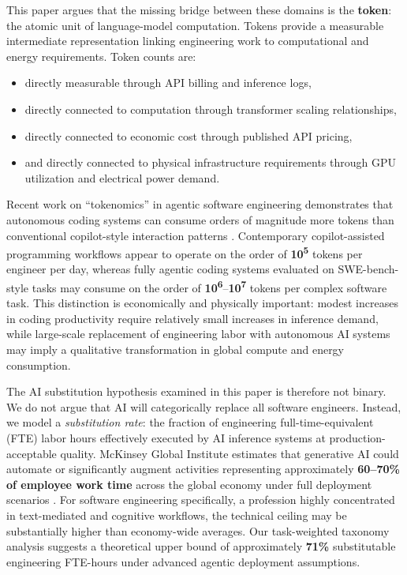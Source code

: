 \documentclass{article}
\begin{document}
This paper argues that the missing bridge between these domains is the \textbf{token}: the atomic unit of language-model computation. Tokens provide a measurable intermediate representation linking engineering work to computational and energy requirements. Token counts are:
\begin{itemize}
  \item directly measurable through API billing and inference logs,
  \item directly connected to computation through transformer scaling relationships,
  \item directly connected to economic cost through published API pricing,
  \item and directly connected to physical infrastructure requirements through GPU utilization and electrical power demand.
\end{itemize}

Recent work on ``tokenomics'' in agentic software engineering demonstrates that autonomous coding systems can consume orders of magnitude more tokens than conventional copilot-style interaction patterns \citep{salim2026tokenomics, bai2026agent}. Contemporary copilot-assisted programming workflows appear to operate on the order of \textbf{10\textsuperscript{5}} tokens per engineer per day, whereas fully agentic coding systems evaluated on SWE-bench-style tasks may consume on the order of \textbf{10\textsuperscript{6}}--\textbf{10\textsuperscript{7}} tokens per complex software task. This distinction is economically and physically important: modest increases in coding productivity require relatively small increases in inference demand, while large-scale replacement of engineering labor with autonomous AI systems may imply a qualitative transformation in global compute and energy consumption.

The AI substitution hypothesis examined in this paper is therefore not binary. We do not argue that AI will categorically replace all software engineers. Instead, we model a \emph{substitution rate}: the fraction of engineering full-time-equivalent (FTE) labor hours effectively executed by AI inference systems at production-acceptable quality. McKinsey Global Institute estimates that generative AI could automate or significantly augment activities representing approximately \textbf{60--70\% of employee work time} across the global economy under full deployment scenarios \citep{mckinsey2023genai}. For software engineering specifically, a profession highly concentrated in text-mediated and cognitive workflows, the technical ceiling may be substantially higher than economy-wide averages. Our task-weighted taxonomy analysis suggests a theoretical upper bound of approximately \textbf{71\%} substitutable engineering FTE-hours under advanced agentic deployment assumptions.
\end{document}

